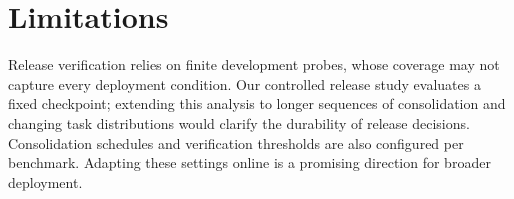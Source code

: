 \section{Limitations}
\label{sec:discussion}
Release verification relies on finite development probes,
whose coverage may not capture every deployment condition.
Our controlled release study evaluates a fixed checkpoint;
extending this analysis to longer sequences of consolidation
and changing task distributions would clarify the durability
of release decisions. Consolidation schedules and verification
thresholds are also configured per benchmark. Adapting these
settings online is a promising direction for broader deployment.